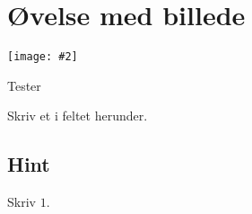 \documentclass{article}
\newenvironment{exercise}[1]{\newpage\section{#1}}{}
\newcommand{\answerbox}[1]{\fbox{$#1$}}
\newcommand{\image}[2]{\texttt{[image: \#2]}}
\newcommand{\hint}{\subsection*{Hint}}
\begin{document}
\tableofcontents
\newpage

\begin{exercise}{Øvelse med billede}

\image{0.25}{mathexerciseimages/complexnumbers/modulusandargument/modulusandargument.png}


Tester

Skriv et i feltet herunder.


\answerbox{1}

\hint
Skriv $1$.
\end{exercise}
\end{document}
